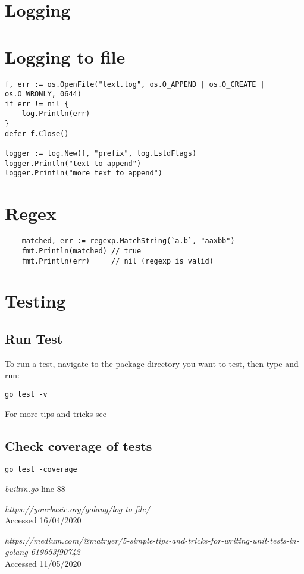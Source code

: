 \documentclass[]{article}
\renewcommand{\it}[1]{\textit{#1}}
\begin{document}
\section{Logging}
\section{Logging to file}
\begin{lstlisting}
f, err := os.OpenFile("text.log", os.O_APPEND | os.O_CREATE | os.O_WRONLY, 0644)
if err != nil {
	log.Println(err)
}
defer f.Close()

logger := log.New(f, "prefix", log.LstdFlags)
logger.Println("text to append")
logger.Println("more text to append")
\end{lstlisting}\cite{logging_to_file}

\section{Regex}
\begin{lstlisting}
	matched, err := regexp.MatchString(`a.b`, "aaxbb")
	fmt.Println(matched) // true
	fmt.Println(err)     // nil (regexp is valid)
\end{lstlisting}

\section{Testing}
\subsection{Run Test}
To run a test, navigate to the package directory you want to test, then type and run:
\begin{lstlisting}
go test -v
\end{lstlisting}

For more tips and tricks see \cite{medium-matryer-5-testing}

\subsection{Check coverage of tests}
\begin{lstlisting}
go test -coverage
\end{lstlisting}


\begin{thebibliography}{99}
	
	\it{builtin.go} line 88
	
	\it{https://yourbasic.org/golang/log-to-file/} \\
	Accessed 16/04/2020
	
	\it{https://medium.com/@matryer/5-simple-tips-and-tricks-for-writing-unit-tests-in-golang-619653f90742} \\
	Accessed 11/05/2020
	
\end{thebibliography}
\end{document}
